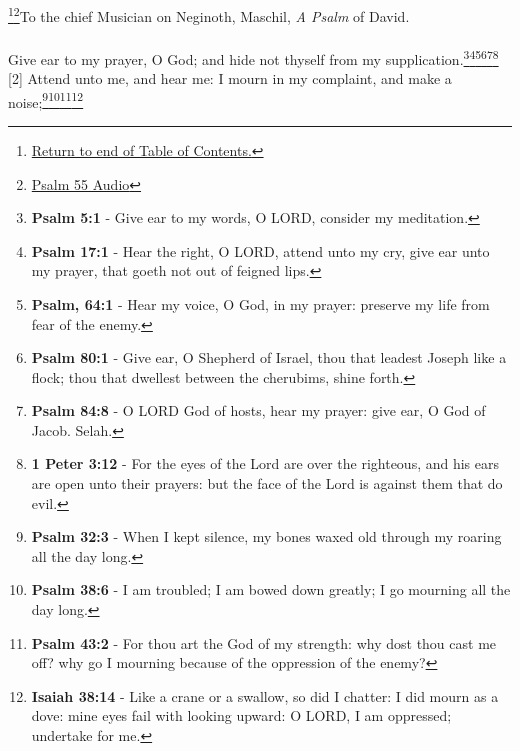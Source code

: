 \footnote{\textcolor[rgb]{0.00,0.25,0.00}{\hyperlink{TOC}{Return to end of Table of Contents.}}}\footnote{\href{https://audiobible.com/bible/psalms_55.html}{\textcolor[cmyk]{0.99998,1,0,0}{Psalm 55 Audio}}}\textcolor[cmyk]{0.99998,1,0,0}{To the chief Musician on Neginoth, Maschil, \emph{A Psalm} of David.}\\
\\
\textcolor[cmyk]{0.99998,1,0,0}{Give ear to my prayer, O God; and hide not thyself from my supplication.}\footnote{\textbf{Psalm 5:1} - Give ear to my words, O LORD, consider my meditation.}\footnote{\textbf{Psalm 17:1} -  Hear the right, O LORD, attend unto my cry, give ear unto my prayer, that goeth not out of feigned lips.}\footnote{\textbf{Psalm, 64:1} - Hear my voice, O God, in my prayer: preserve my life from fear of the enemy.}\footnote{\textbf{Psalm 80:1} - Give ear, O Shepherd of Israel, thou that leadest Joseph like a flock; thou that dwellest between the cherubims, shine forth.}\footnote{\textbf{Psalm 84:8} - O LORD God of hosts, hear my prayer: give ear, O God of Jacob. Selah.}\footnote{\textbf{1 Peter 3:12} - For the eyes of the Lord are over the righteous, and his ears are open unto their prayers: but the face of the Lord is against them that do evil.}
[2] \textcolor[cmyk]{0.99998,1,0,0}{Attend unto me, and hear me: I mourn in my complaint, and make a noise;}\footnote{\textbf{Psalm 32:3} - When I kept silence, my bones waxed old through my roaring all the day long.}\footnote{\textbf{Psalm 38:6} - I am troubled; I am bowed down greatly; I go mourning all the day long.}\footnote{\textbf{Psalm 43:2} - For thou art the God of my strength: why dost thou cast me off? why go I mourning because of the oppression of the enemy?}\footnote{\textbf{Isaiah 38:14} - Like a crane or a swallow, so did I chatter: I did mourn as a dove: mine eyes fail with looking upward: O LORD, I am oppressed; undertake for me.}
